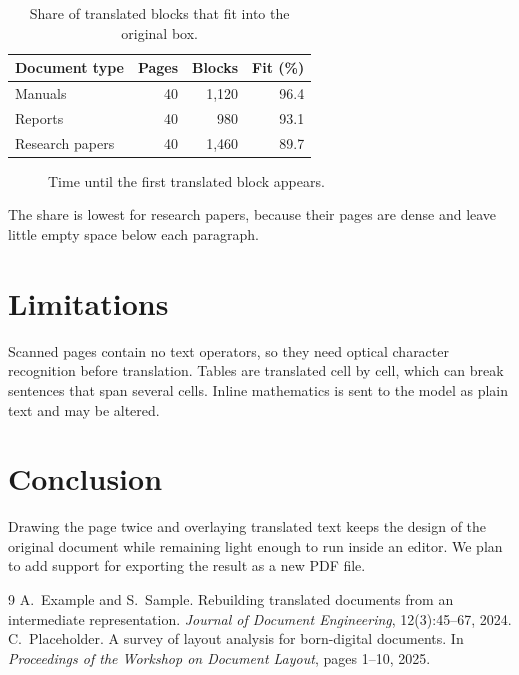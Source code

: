 \documentclass[10pt,twocolumn]{article}
\begin{document}
\begin{table}[t]
\centering\small
\caption{Share of translated blocks that fit into the original box.}
\begin{tabular}{lrrr}
\toprule
Document type & Pages & Blocks & Fit (\%)\\
\midrule
Manuals & 40 & 1,120 & 96.4\\
Reports & 40 & 980 & 93.1\\
Research papers & 40 & 1,460 & 89.7\\
\bottomrule
\end{tabular}
\end{table}

\begin{figure}[t]
\centering
{}
\caption{Time until the first translated block appears.}
\end{figure}

The share is lowest for research papers, because their pages are dense and leave
little empty space below each paragraph.

\section{Limitations}
Scanned pages contain no text operators, so they need optical character recognition
before translation. Tables are translated cell by cell, which can break sentences that
span several cells. Inline mathematics is sent to the model as plain text and may be
altered.

\section{Conclusion}
Drawing the page twice and overlaying translated text keeps the design of the original
document while remaining light enough to run inside an editor. We plan to add support
for exporting the result as a new PDF file.

\begin{thebibliography}{9}\small
{} A.~Example and S.~Sample. Rebuilding translated documents from an
intermediate representation. \emph{Journal of Document Engineering}, 12(3):45--67, 2024.
 C.~Placeholder. A survey of layout analysis for born-digital documents. In
\emph{Proceedings of the Workshop on Document Layout}, pages 1--10, 2025.
\end{thebibliography}
\end{document}
